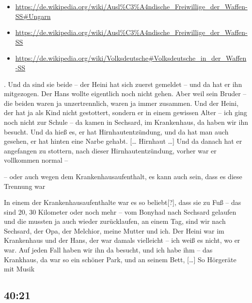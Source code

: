 \documentclass[ngerman,]{article}
\providecommand{\tightlist}{%
  \setlength{\itemsep}{0pt}\setlength{\parskip}{0pt}}
\begin{document}
\begin{multicols}{3}
\begin{description}
{  \begin{itemize}
  \tightlist
  \item
    \url{https://de.wikipedia.org/wiki/Ausl\%C3\%A4ndische_Freiwillige_der_Waffen-SS\#Ungarn}
  \item
    \url{https://de.wikipedia.org/wiki/Ausl\%C3\%A4ndische_Freiwillige_der_Waffen-SS}
  \item
    \url{https://de.wikipedia.org/wiki/Volksdeutsche\#Volksdeutsche_in_der_Waffen-SS}
  \end{itemize}}. Und da sind sie beide – der Heini hat sich zuerst
gemeldet – und da hat er ihn mitgezogen. Der Hans wollte eigentlich noch
nicht gehen. Aber weil sein Bruder – die beiden waren ja unzertrennlich,
waren ja immer zusammen. Und der Heini, der hat ja als Kind nicht
gestottert, sondern er in einem gewissen Alter – ich ging noch nicht zur
Schule – da kamen in Sechsard, im Krankenhaus, da haben wir ihn besucht.
Und da hieß es, er hat Hirnhautentzündung, und da hat man auch gesehen,
er hat hinten eine Narbe gehabt. {[}\ldots{} Hirnhaut \ldots{}{]} Und da
danach hat er angefangen zu stottern, nach dieser Hirnhautentzündung,
vorher war er vollkommen normal –
\end{description}

\begin{description}
\tightlist
\item[Ruth]
– oder auch wegen dem Krankenhausaufenthalt, es kann auch sein, dass es
diese Trennung war
\item[Käthe]
In einem der Krankenhausaufenthalte war es so beliebt{[}?{]}, dass sie
zu Fuß – das sind 20, 30 Kilometer oder noch mehr – vom Bonyhad nach
Sechsard gelaufen und die mussten ja auch wieder zurücklaufen, an einem
Tag, sind wir nach Sechsard, der Opa, der Melchior, meine Mutter und
ich. Der Heini war im Krankenhaus und der Hans, der war damals
vielleicht – ich weiß es nicht, wo er war. Auf jeden Fall haben wir ihn
da besucht, und ich habe ihm – das Krankhaus, da war so ein schöner
Park, und an seinem Bett, {[}\ldots{}{]} So Hörgeräte mit Musik
\end{description}

\hypertarget{section-2}{%
\subsection{40:21}\label{section-2}}


\end{multicols}
\end{document}
